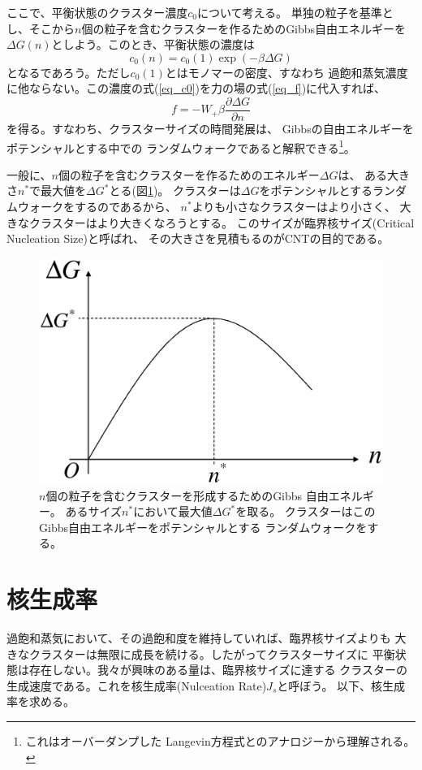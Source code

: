 \documentclass{jarticle}
\begin{document}
ここで、平衡状態のクラスター濃度$c_0$について考える。
単独の粒子を基準とし、そこから$n$個の粒子を含むクラスターを作るためのGibbs自由エネルギーを
$\Delta G(n)$としよう。このとき、平衡状態の濃度は
\begin{equation}
    c_0(n) = c_0(1) \exp \left( -\beta \Delta G \right) \label{eq_c0}
\end{equation}
となるであろう。ただし$c_0(1)$とはモノマーの密度、すなわち
過飽和蒸気濃度に他ならない。この濃度の式(\ref{eq_c0})を力の場の式(\ref{eq_f})に代入すれば、
$$
    f = - W_+ \beta \frac{\partial \Delta G}{\partial n}
$$
を得る。すなわち、クラスターサイズの時間発展は、
Gibbsの自由エネルギーをポテンシャルとする中での
ランダムウォークであると解釈できる\footnote{これはオーバーダンプした
    Langevin方程式とのアナロジーから理解される。}。

一般に、$n$個の粒子を含むクラスターを作るためのエネルギー$\Delta G$は、
ある大きさ$n^*$で最大値を$\Delta G^*$とる(図\ref{fig_deltaG})。
クラスターは$\Delta G$をポテンシャルとするランダムウォークをするのであるから、
$n^*$よりも小さなクラスターはより小さく、
大きなクラスターはより大きくなろうとする。
このサイズが臨界核サイズ(Critical Nucleation Size)と呼ばれ、
その大きさを見積もるのがCNTの目的である。

\begin{figure}[htbp]
    \begin{center}
        \includegraphics[width=0.48\linewidth]{deltaG.eps}
    \end{center}
    \caption{
        $n$個の粒子を含むクラスターを形成するためのGibbs 自由エネルギー。
        あるサイズ$n^*$において最大値$\Delta G^*$を取る。
        クラスターはこのGibbs自由エネルギーをポテンシャルとする
        ランダムウォークをする。
    }
    \label{fig_deltaG}
\end{figure}

\section{核生成率}

過飽和蒸気において、その過飽和度を維持していれば、臨界核サイズよりも
大きなクラスターは無限に成長を続ける。したがってクラスターサイズに
平衡状態は存在しない。我々が興味のある量は、臨界核サイズに達する
クラスターの生成速度である。これを核生成率(Nulceation Rate)$J_s$と呼ぼう。
以下、核生成率を求める。
\end{document}
